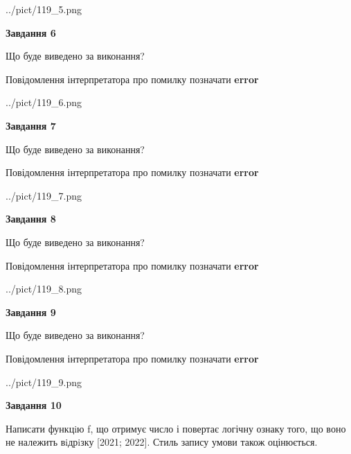 \documentclass[12pt, ukrainian]{article}
\begin{document}
{\begin {large}
\begin{center}
	{../pict/119_5.png}
\end{center}
\newpage

{\begin {center}\textbf{Завдання 6}\end {center}}\par
Що буде виведено за виконання? \par
Повідомлення інтерпретатора про помилку позначати \textbf{error}

\begin{center}
	{../pict/119_6.png}
\end{center}
\newpage

{\begin {center}\textbf{Завдання 7}\end {center}}\par
Що буде виведено за виконання? \par
Повідомлення інтерпретатора про помилку позначати \textbf{error}

\begin{center}
	{../pict/119_7.png}
\end{center}
\newpage

{\begin {center}\textbf{Завдання 8}\end {center}}\par
Що буде виведено за виконання? \par
Повідомлення інтерпретатора про помилку позначати \textbf{error}

\begin{center}
	{../pict/119_8.png}
\end{center}
\newpage

{\begin {center}\textbf{Завдання 9}\end {center}}\par
Що буде виведено за виконання? \par
Повідомлення інтерпретатора про помилку позначати \textbf{error}

\begin{center}
	{../pict/119_9.png}
\end{center}
\newpage

{\begin {center}\textbf{Завдання 10}\end {center}}\par

Написати функцiю f, що отримує число і повертає логічну ознаку того, що воно не належить вiдрiзку [2021; 2022]. Стиль запису умови також оцінюється.\par
\newpage

\end {large}}
\end{document}
